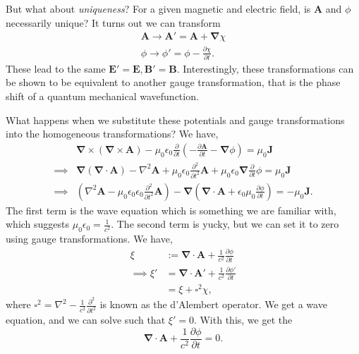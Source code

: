 \documentclass{article}
\numberwithin{equation}{section}
\begin{document}
But what about \textit{uniqueness}? For a given magnetic and electric field, is $\bm{A}$ and $\phi$ necessarily unique? It turns out we can transform 
\begin{align}
    \bm{A} \to \bm{A}' = \bm{A} + \bm{\nabla}\chi \\ 
    \phi \to \phi' = \phi - \frac{\partial \chi}{\partial t}.
\end{align}
These lead to the same $\bm{E}'=\bm{E},\bm{B}'=\bm{B}.$ Interestingly, these transformations can be shown to be equivalent to another gauge transformation, that is the phase shift of a quantum mechanical wavefunction.

What happens when we substitute these potentials and gauge transformations into the homogeneous transformations? We have,
\begin{align}
    &\bm{\nabla} \times (\bm{\nabla} \times \bm{A}) - \mu_0\epsilon_0 \frac{\partial}{\partial t}\left(-\frac{\partial \bm{A}}{\partial t} - \bm{\nabla}\phi\right) = \mu_0 \bm{J} \\
    \implies & \bm{\nabla}(\bm{\nabla}\cdot \bm{A}) - \nabla^2 \bm{A} + \mu_0\epsilon_0 \frac{\partial^2}{\partial t^2}\bm{A} + \mu_0\epsilon_0 \bm{\nabla} \frac{\partial}{\partial t}\phi = \mu_0\bm{J} \\ 
    \implies & \left(\nabla^2 \bm{A} - \mu_0\epsilon_0\epsilon_0 \frac{\partial^2}{\partial t^2}\bm{A} \right) - \bm{\nabla}(\bm{\nabla}\cdot \bm{A} + \epsilon_0\mu_0 \frac{\partial\phi}{\partial t}) = - \mu_0 \bm{J}.
\end{align}
The first term is the wave equation which is something we are familiar with, which suggests $\mu_0\epsilon_0= \frac{1}{c^2}.$ The second term is yucky, but we can set it to zero using gauge transformations. We have,
\begin{align}
    \xi &:= \bm{\nabla}\cdot \bm{A} + \frac{1}{c^2} \frac{\partial \phi}{\partial t} \\ 
    \implies \xi' &= \bm{\nabla}\cdot \bm{A}' + \frac{1}{c^2}\frac{\partial \phi'}{\partial t} \\ 
    &= \xi + \square^2 \chi,
\end{align}
where $\square^2 = \nabla^2 - \frac{1}{c^2}\frac{\partial^2}{\partial t^2}$ is known as the d'Alembert operator. We get a wave equation, and we can solve such that $\xi'=0.$ With this, we get the 
\begin{equation}
    \boxed{\bm{\nabla}\cdot\bm{A} + \frac{1}{c^2}\frac{\partial \phi}{\partial t} = 0.}
\end{equation}
\end{document}
